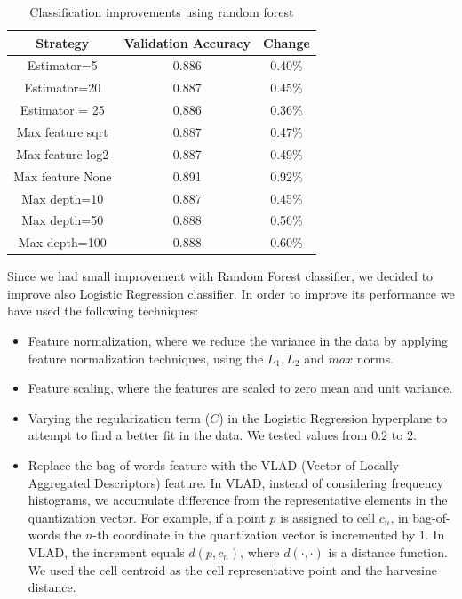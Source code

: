 \documentclass[12pt]{article}
\begin{document}
\begin{table}[H]
	\centering
	\begin{tabular}{|c|c|c|}
		\hline
		\textbf{Strategy} & \textbf{Validation Accuracy} & \textbf{Change} \\ \hline
		Estimator=5       & 0.886                        & 0.40\%          \\ \hline
		Estimator=20      & 0.887                        & 0.45\%          \\ \hline
		Estimator = 25    & 0.886                        & 0.36\%          \\ \hline
		Max feature sqrt  & 0.887                        & 0.47\%          \\ \hline
		Max feature log2  & 0.887                        & 0.49\%          \\ \hline
		Max feature None  & 0.891                        & 0.92\%          \\ \hline
		Max depth=10      & 0.887                        & 0.45\%          \\ \hline
		Max depth=50      & 0.888                        & 0.56\%          \\ \hline
		Max depth=100     & 0.888                        & 0.60\%          \\ \hline
	\end{tabular}
	\label{impr1}
	\caption{Classification improvements using random forest}
\end{table}

Since we had small improvement with Random Forest classifier, we decided to improve also Logistic Regression classifier. In order to improve its performance we have used the following techniques:

\begin{itemize}
	\item Feature normalization, where we reduce the variance in the data by
	applying feature normalization techniques, using the $L_1, L_2$ and $max$ norms.
	\item Feature scaling, where the features are scaled to zero mean and unit variance.
	\item Varying the regularization term ($C$) in the Logistic Regression hyperplane
	to attempt to find a better fit in the data. We tested values from $0.2$ to $2$.
	\item Replace the bag-of-words feature with the VLAD (Vector of Locally
	Aggregated Descriptors) feature. In VLAD,
	instead of considering frequency histograms, we accumulate difference
	from the representative elements in the quantization vector. For example,
	if a point $p$ is assigned to cell $c_n$, in bag-of-words the $n$-th
	coordinate in the quantization vector is incremented by $1$. In VLAD, the
	increment equals $d(p,c_n)$, where $d(\cdot,\cdot)$ is a distance function.
	We used the cell centroid as the cell representative point and the
	harvesine distance. 
\end{itemize}
\end{document}
